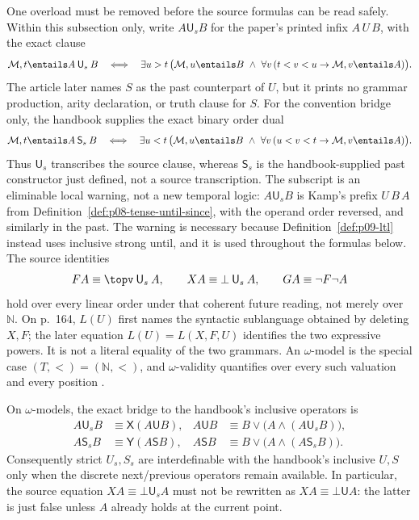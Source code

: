 One overload must be removed before the source formulas can be read safely.
Within this subsection only, write \(A\mathbin{\mathsf U_s}B\) for the paper's
printed infix \(A\,U\,B\), with the exact clause
\[
 \mathcal M,t\entails A\mathbin{\mathsf U_s}B
 \quad\Longleftrightarrow\quad
 \exists u>t\,
 \bigl(\mathcal M,u\entails B\ \land\
   \forall v\,(t<v<u\to\mathcal M,v\entails A)\bigr).
\]
The article later names \(S\) as the past counterpart of \(U\), but it prints
no grammar production, arity declaration, or truth clause for \(S\).  For the
convention bridge only, the handbook supplies the exact binary order dual
\[
 \mathcal M,t\entails A\mathbin{\mathsf S_s}B
 \quad\Longleftrightarrow\quad
 \exists u<t\,
 \bigl(\mathcal M,u\entails B\ \land\
   \forall v\,(u<v<t\to\mathcal M,v\entails A)\bigr).
\]
Thus \(\mathsf U_s\) transcribes the source clause, whereas \(\mathsf S_s\) is
the handbook-supplied past constructor just defined, not a source
transcription.  The subscript is an eliminable local warning, not a new
temporal logic: \(A\mathbin{\mathsf U_s}B\) is Kamp's prefix
\(U\,B\,A\) from Definition~\ref{def:p08-tense-until-since}, with the operand
order reversed, and similarly in the past.  The warning is necessary because
Definition~\ref{def:p09-ltl} instead uses inclusive strong until, and it is used
throughout the formulas below.  The source identities
\[
 FA\equiv \topv\mathbin{\mathsf U_s}A,
 \qquad
 XA\equiv \bot\mathbin{\mathsf U_s}A,
 \qquad
 GA\equiv\neg F\neg A
\]
hold over every linear order under that coherent future reading, not merely
over \(\mathbb N\).  On p.~164, \(L(U)\) first names the syntactic sublanguage
obtained by deleting \(X,F\); the later equation \(L(U)=L(X,F,U)\) identifies
the two expressive powers.  It is not a literal equality of the two grammars.
An \(\omega\)-model is the special case \((T,<)=(\mathbb N,<)\),
and \(\omega\)-validity quantifies over every such valuation and every
position \cite[pp.~163--164]{GabbayPnueliShelahStavi1980}.

On \(\omega\)-models, the exact bridge to the handbook's inclusive operators
is
\[
\begin{aligned}
 A\mathbin{\mathsf U_s}B
   &\equiv \mathsf X(A\mathbin{\mathsf U}B),
 &A\mathbin{\mathsf U}B
   &\equiv B\lor\bigl(A\land
      (A\mathbin{\mathsf U_s}B)\bigr),\\
 A\mathbin{\mathsf S_s}B
   &\equiv \mathsf Y(A\mathbin{\mathsf S}B),
 &A\mathbin{\mathsf S}B
   &\equiv B\lor\bigl(A\land
      (A\mathbin{\mathsf S_s}B)\bigr).
\end{aligned}
\]
Consequently strict \(U_s,S_s\) are interdefinable with the handbook's
inclusive \(U,S\) only when the discrete next/previous operators remain
available.  In particular, the source equation
\(XA\equiv\bot\mathbin{\mathsf U_s}A\) must not be rewritten as
\(XA\equiv\bot\mathbin{\mathsf U}A\): the latter is just false unless \(A\)
already holds at the current point.

